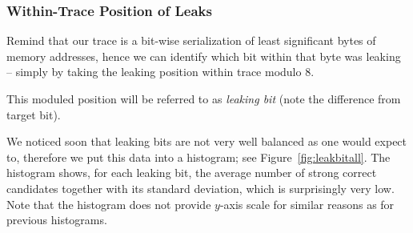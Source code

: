 	
	
	

\subsubsection{Within-Trace Position of Leaks}
	
	Remind that our trace is a bit-wise serialization of least significant bytes of memory addresses, hence we can identify which bit within that byte was leaking -- simply by taking the leaking position within trace modulo $8$.
	
	\begin{note}
	\label{note:leakbit}
		This moduled position will be referred to as {\em leaking bit} (note the difference from target bit).
	\end{note}
	
	We noticed soon that leaking bits are not very well balanced as one would expect to, therefore we put this data into a histogram; see Figure~\ref{fig:leakbitall}. The histogram shows, for each leaking bit, the average number of strong correct candidates together with its standard deviation, which is surprisingly very low. Note that the histogram does not provide $y$-axis scale for similar reasons as for previous histograms.
	
